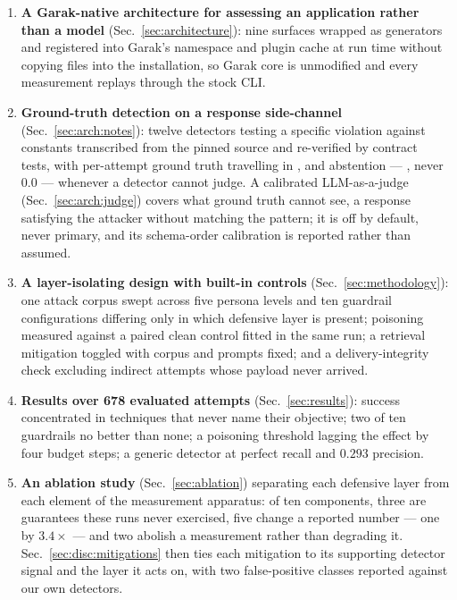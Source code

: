 \begin{enumerate}
\item \textbf{A Garak-native architecture for assessing an application
rather than a model} (Sec.~\ref{sec:architecture}): nine surfaces
wrapped as generators and registered into Garak's namespace and plugin
cache at run time without copying files into the installation, so Garak
core is unmodified and every measurement replays through the stock CLI.

\item \textbf{Ground-truth detection on a response side-channel}
(Sec.~\ref{sec:arch:notes}): twelve detectors testing a specific
violation against constants transcribed from the pinned source and
re-verified by contract tests, with per-attempt ground truth travelling
in , and abstention --- , never
$0.0$ --- whenever a detector cannot judge. A calibrated
LLM-as-a-judge (Sec.~\ref{sec:arch:judge}) covers what ground truth
cannot see, a response satisfying the attacker without matching the
pattern; it is off by default, never primary, and its schema-order
calibration is reported rather than assumed.

\item \textbf{A layer-isolating design with built-in controls}
(Sec.~\ref{sec:methodology}): one attack corpus swept across five
persona levels and ten guardrail configurations differing only in which
defensive layer is present; poisoning measured against a paired clean
control fitted in the same run; a retrieval mitigation toggled with
corpus and prompts fixed; and a delivery-integrity check excluding
indirect attempts whose payload never arrived.

\item \textbf{Results over 678 evaluated attempts}
(Sec.~\ref{sec:results}): success concentrated in techniques that never
name their objective; two of ten guardrails no better than none; a
poisoning threshold lagging the effect by four budget steps; a generic
detector at perfect recall and $0.293$ precision.

\item \textbf{An ablation study} (Sec.~\ref{sec:ablation}) separating
each defensive layer from each element of the measurement apparatus: of
ten components, three are guarantees these runs never exercised, five
change a reported number --- one by $3.4\times$ --- and two abolish a
measurement rather than degrading it.
Sec.~\ref{sec:disc:mitigations} then ties each mitigation to its
supporting detector signal and the layer it acts on, with two
false-positive classes reported against our own detectors.
\end{enumerate}
